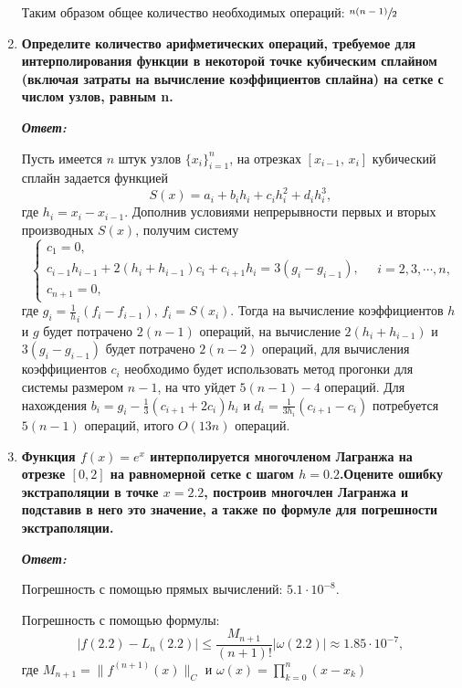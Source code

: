 \documentclass[12pt, a4paper]{article}
\newcommand{\norm}[1]{\lVert #1 \rVert}
\newcommand{\abs}[1]{\lvert #1 \rvert}
\begin{document}
\begin{enumerate}
	Таким образом общее количество необходимых операций: $\sfrac{n(n-1)}{2}$
	
	\item \textbf{Определите количество арифметических операций, требуемое для интерполирования функции в некоторой точке кубическим сплайном (включая затраты на вычисление коэффициентов сплайна) на сетке с числом узлов, равным n.}
	\vspace*{0.2cm}
	
	\textit{\textbf{Ответ:}}
	
	Пусть имеется $n$ штук узлов $\{ x_i\}_{i=1}^n$, на отрезках $[x_{i-1}, \, x_i]$ кубический сплайн задается функцией
$$
S(x) = a_i + b_i h_i + c_i h_i^2 + d_i h_i^3,
$$
где $h_i = x_i - x_{i- 1}$. Дополнив условиями непрерывности первых и вторых производных $S(x)$, получим систему
\begin{equation*}
	\begin{cases}
		c_1 = 0, \\
		c_{i - 1} h_{i -1} + 2 (h_i + h_{i-1}) c_i + c_{i+1} h_i = 3 (g_i - g_{i -1}), \\
		c_{n+1} = 0,
	\end{cases}
	\quad i = 2, 3, \dotsb, n,
\end{equation*}
где $g_i = \frac 1 h_i (f_i - f_{i - 1}), \, f_i = S(x_i)$. Тогда на вычисление коэффициентов $h$ и $g$ будет потрачено $2(n -1)$ операций, на вычисление $2(h_i + h_{i-1})$ и $3 (g_i - g_{i -1})$ будет потрачено $2(n - 2)$ операций, для вычисления коэффициентов $c_i$ необходимо будет использовать метод прогонки для системы размером $n - 1$, на что уйдет $5(n - 1) - 4$ операций. Для нахождения $b_i = g_i - \frac 1 3 (c_{i + 1} + 2 c_i) h_i$ и $d_i = \frac{1}{3 h_i} (c_{i + 1} - c_i)$ потребуется $5 (n - 1)$ операций, итого $O(13n)$ операций.

	\item \textbf{Функция $f(x) = e ^ x$ интерполируется многочленом Лагранжа на отрезке $[0, 2]$ на равномерной сетке с шагом $h=0.2$.Оцените ошибку экстраполяции в точке $x = 2.2$, построив многочлен Лагранжа и подставив в него это значение, а также по формуле для погрешности экстраполяции.}
	\vspace*{0.2cm}

	\textit{\textbf{Ответ:}}
	
	Погрешность с помощью прямых вычислений: $5.1 \cdot 10^{-8}$.
	
	Погрешность с помощью формулы:
	\[
	\abs{f(2.2) - L_n(2.2)} \le \dfrac{M_{n+1}}{(n+1)!}\abs{\omega(2.2)} \approx 1.85 \cdot 10^{-7},
	\]
	где $M_{n+1} = \norm{f^{(n+1)}(x)}_C$ и $\omega(x) = \prod\limits_{k=0}^{n}(x - x_k)$
	

\end{enumerate}
\end{document}
